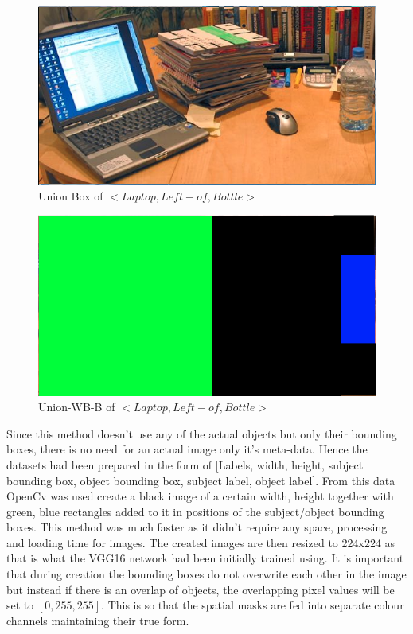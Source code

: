 \documentclass{csfyp}
\begin{document}
\begin{figure}[!htbp]
\centering
\includegraphics[scale=0.35]{UnionBox.pdf}
\caption{Union Box of $<Laptop, Left-of , Bottle>$}
\end{figure}

\begin{figure}[!htbp]
\centering
\includegraphics[scale=0.35]{UnionWBB.pdf}
\caption{Union-WB-B  of $<Laptop, Left-of , Bottle>$}
\end{figure}

Since this method doesn't use any of the actual objects but only their bounding boxes, there is no need for an actual image only it’s meta-data. Hence the datasets had been prepared in the form of [Labels, width, height, subject bounding box, object bounding box, subject label, object label]. From this data OpenCv was used create a black image of a certain width, height together with green, blue rectangles added to it in positions of the subject/object bounding boxes. This method was much faster as it didn’t require any space, processing and loading time for images. The created images are then resized to 224x224 as that is what the VGG16 network had been initially trained using. It is important that during creation the bounding boxes do not overwrite each other in the image but instead if there is an overlap of objects, the overlapping pixel values will be set to $[0,255,255]$. This is so that the spatial masks are fed into separate colour channels maintaining their true form.
\end{document}
